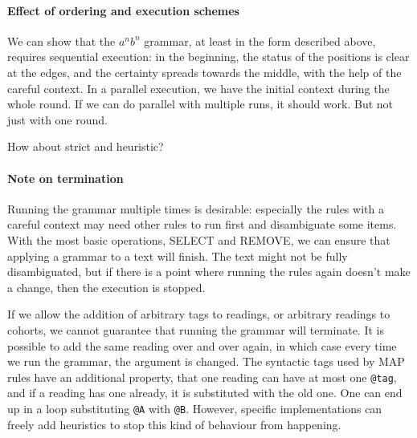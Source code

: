 



\paragraph{Effect of ordering and execution schemes}

We can show that the $a^nb^n$ grammar, at least in the form described above,
requires sequential execution: in the beginning, the status of the positions is 
clear at the edges, and the certainty spreads towards the middle, with the help of
the careful context.
In a parallel execution, we have the initial context during the whole round.
If we can do parallel with multiple runs, it should work. But not just with one round.

How about strict and heuristic?

\paragraph{Note on termination} 
Running the grammar multiple times is desirable: especially the rules
with a careful context may need other rules to run first and
disambiguate some items.
With the most basic operations, SELECT and REMOVE, we can ensure that
applying a grammar to a text will finish. The text might not be fully
disambiguated, but if there is a point where running the rules again
doesn't make a change, then the execution is stopped.

If we allow the addition of arbitrary tags to readings, or arbitrary
readings to cohorts, we cannot guarantee that running the grammar will
terminate. It is possible to add the same reading over and over again,
in which case every time we run the grammar, the argument is changed.
The syntactic tags used by MAP rules have an additional property,
that one reading can have at most one \texttt{@tag}, and if a reading has one
already, it is substituted with the old one. One can end up in a loop
substituting \texttt{@A} with \texttt{@B}.
However, specific implementations can freely add heuristics to stop
this kind of behaviour from happening.


